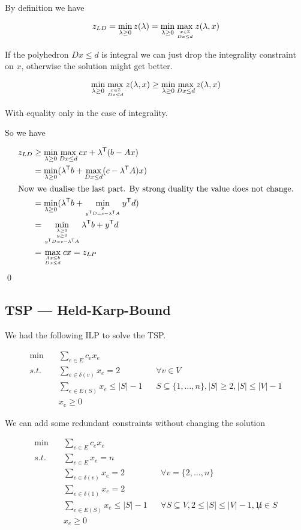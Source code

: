 \begin{pr} By definition we have

\[z_{LD} = \min_{\lambda \geq 0} z(\lambda) = \min_{\lambda\geq 0} \max_{{x\in \mathbb{Z}}\atop {Dx\leq d}} z(\lambda,x)\]

If the polyhedron $Dx\leq d$ is integral we can just drop the integrality constraint on $x$, otherwise the solution might get better.

\[\min_{\lambda\geq 0} \max_{{x\in \mathbb{Z}}\atop {Dx\leq d}} z(\lambda,x) \geq \min_{\lambda\geq 0} \max_{Dx\leq d} z(\lambda,x)\]

With equality only in the case of integrality.

So we have

\begin{align*}
z_{LD} &\geq \min_{\lambda\geq 0} \max_{Dx\leq d} cx+ {\lambda}^\text{\upshape \sffamily T}(b-Ax)\\
	& = \min_{\lambda \geq 0} ({\lambda}^\text{\upshape \sffamily T}b+\max_{Dx\leq d}(c-{\lambda}^\text{\upshape \sffamily T}A)x)\\
\intertext{Now we dualise the last part. By strong duality the value does not change.}
	& = \min_{\lambda \geq 0} ({\lambda}^\text{\upshape \sffamily T} b+\min_{y\atop {{y}^\text{\upshape \sffamily T}D=c-{\lambda}^\text{\upshape \sffamily T}A}} {y}^\text{\upshape \sffamily T} d)\\
	&= \min_{{{\lambda \geq 0}\atop {y\geq 0}}\atop {{y}^\text{\upshape \sffamily T}D=c-{\lambda}^\text{\upshape \sffamily T}A}} {\lambda}^\text{\upshape \sffamily T} b+ {y}^\text{\upshape \sffamily T} d\\
	&=\max_{{Ax\leq b}\atop {Dx\leq d}} cx = z_{LP}
\end{align*}
\qed \end{pr}

\subsection{TSP --- Held-Karp-Bound}

We had the following ILP to solve the TSP.

\begin{align*}
\min \quad & \sum_{e\in E} c_{e}x_{e}\\
s.t. \quad & \sum_{e\in \delta(v)} x_{e} = 2 && \forall v\in V\\
	& \sum_{e\in E(S)} x_{e} \leq |S|-1 && S \subseteq \{1,\ldots,n\}, |S|\geq 2, |S| \leq |V|-1\\
	& x_{e} \geq  0
\end{align*}

We can add some redundant constraints without changing the solution

\begin{align*}
\min \quad & \sum_{e\in E} c_{e}x_{e}\\
s.t. \quad & \sum_{e\in E} x_e = n\\
	&\sum_{e\in \delta(v)} x_e=2 && \forall v=\{2,\ldots,n\}\\
	&\sum_{e\in \delta(1)} x_e=2\\
	&\sum_{e\in E(S)} x_e \leq |S|-1 && \forall S \subseteq V, 2\leq |S|\leq |V|-1,1\not i\in S\\
	& x_{e} \geq  0
\end{align*}

